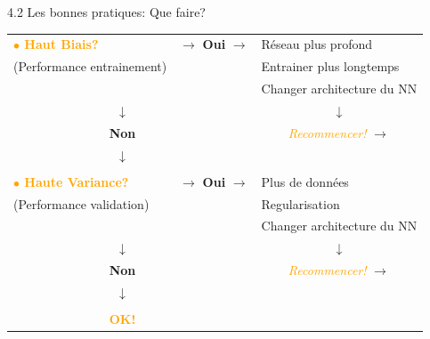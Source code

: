\begin{frame}{4.2 Les bonnes pratiques: Que faire?}
  \begin{table}
    \footnotesize
    \begin{tabular}{ccccl}
      \multicolumn{3}{l}{\textcolor{orange}{\textbf{$\bullet$ Haut Biais?}}} & \boldmath $\rightarrow$ \textbf{Oui} $\rightarrow$ \unboldmath & Réseau plus profond \\
      \multicolumn{3}{l}{(Performance entrainement)} & & Entrainer plus longtemps \\
      & & & & Changer architecture du NN \\
      & & \boldmath $\downarrow$ \unboldmath & & \multicolumn{1}{c}{\boldmath $\downarrow$ \boldmath} \\
      & & \textbf{Non} & & \multicolumn{1}{c}{\textit{\textcolor{orange}{Recommencer!}} \boldmath $\rightarrow$ \unboldmath}\\
      & & \boldmath $\downarrow$ \unboldmath & & \\
      & & & & \\
      \multicolumn{3}{l}{\textcolor{orange}{\textbf{$\bullet$ Haute Variance?}}} & \boldmath $\rightarrow$ \textbf{Oui} $\rightarrow$ \unboldmath & Plus de données \\
      \multicolumn{3}{l}{(Performance validation)} & & Regularisation \\
      & & & & Changer architecture du NN \\
      & & \boldmath $\downarrow$ \unboldmath & & \multicolumn{1}{c}{\boldmath $\downarrow$ \boldmath} \\
      & & \textbf{Non} & & \multicolumn{1}{c}{\textit{\textcolor{orange}{Recommencer!}} \boldmath $\rightarrow$ \unboldmath}\\
      & & \boldmath $\downarrow$ \unboldmath & & \\
      & & & & \\
      & & \textcolor{orange}{\textbf{OK!}} & & \\      
    \end{tabular}
  \end{table}
\end{frame}

